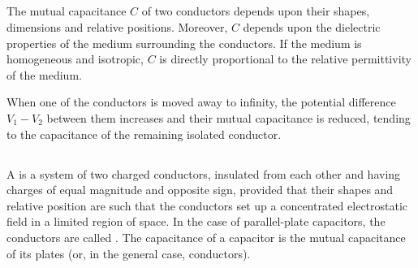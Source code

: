 \subsection{}\label{17.2.3} The mutual capacitance $C$ of two conductors depends upon their shapes, dimensions and relative positions. Moreover, $C$ depends upon the dielectric properties of the medium surrounding the conductors. If the medium is homogeneous and isotropic, $C$ is directly proportional to the relative permittivity  of the medium.

When one of the conductors is moved away to infinity, the potential difference $V_{1} - V_{2}$ between them increases and their mutual capacitance is reduced, tending to the capacitance of the remaining isolated conductor.

\subsection{}\label{17.2.4} A  is a system of two charged conductors, insulated from each other and having charges of equal magnitude and opposite sign, provided that their shapes and relative position are such that the conductors set up a concentrated electrostatic field in a limited region of space. In the case of parallel-plate capacitors, the conductors are called . The capacitance of a capacitor is the mutual capacitance of its plates (or, in the general case, conductors).




